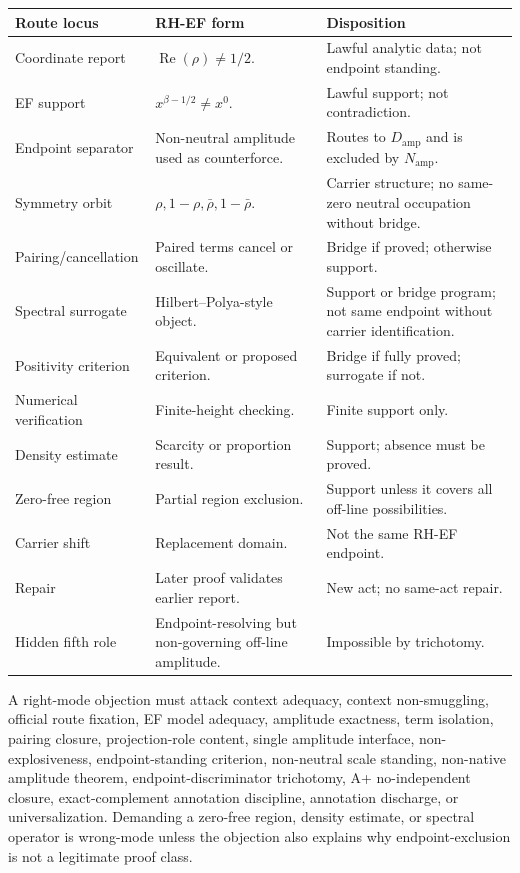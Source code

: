 \documentclass[11pt]{article}
\DeclareMathOperator{\Ree}{Re}
\newcommand{\Damp}{D_{\mathrm{amp}}}
\newcommand{\Namp}{N_{\mathrm{amp}}}
\begin{document}
\begingroup\small
\begin{longtable}{L{0.22\textwidth}L{0.36\textwidth}L{0.32\textwidth}}
\toprule
\textbf{Route locus} & \textbf{RH-EF form} & \textbf{Disposition}\\
\midrule
Coordinate report & \(\Ree(\rho)\ne1/2\). & Lawful analytic data; not endpoint standing.\\
EF support & \(x^{\beta-1/2}\ne x^0\). & Lawful support; not contradiction.\\
Endpoint separator & Non-neutral amplitude used as counterforce. & Routes to \(\Damp\) and is excluded by \(\Namp\).\\
Symmetry orbit & \(\rho,1-\rho,\bar\rho,1-\bar\rho\). & Carrier structure; no same-zero neutral occupation without bridge.\\
Pairing/cancellation & Paired terms cancel or oscillate. & Bridge if proved; otherwise support.\\
Spectral surrogate & Hilbert--Polya-style object. & Support or bridge program; not same endpoint without carrier identification.\\
Positivity criterion & Equivalent or proposed criterion. & Bridge if fully proved; surrogate if not.\\
Numerical verification & Finite-height checking. & Finite support only.\\
Density estimate & Scarcity or proportion result. & Support; absence must be proved.\\
Zero-free region & Partial region exclusion. & Support unless it covers all off-line possibilities.\\
Carrier shift & Replacement domain. & Not the same RH-EF endpoint.\\
Repair & Later proof validates earlier report. & New act; no same-act repair.\\
Hidden fifth role & Endpoint-resolving but non-governing off-line amplitude. & Impossible by trichotomy.\\
\bottomrule
\end{longtable}
\endgroup

A right-mode objection must attack context adequacy, context non-smuggling, official route fixation, EF model adequacy, amplitude exactness, term isolation, pairing closure, projection-role content, single amplitude interface, non-explosiveness, endpoint-standing criterion, non-neutral scale standing, non-native amplitude theorem, endpoint-discriminator trichotomy, A+ no-independent closure, exact-complement annotation discipline, annotation discharge, or universalization.  Demanding a zero-free region, density estimate, or spectral operator is wrong-mode unless the objection also explains why endpoint-exclusion is not a legitimate proof class.
\end{document}
